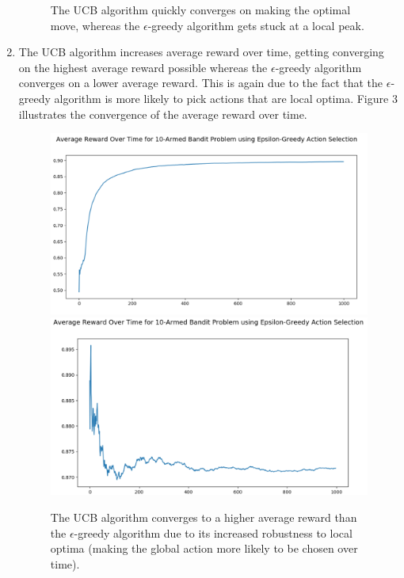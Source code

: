 \documentclass{article}
\begin{document}
\begin{enumerate}
\begin{figure}[h]
	\caption{The UCB algorithm quickly converges on making the optimal move, whereas the $\epsilon$-greedy algorithm gets stuck at a local peak.}
	\end{figure}
	\item The UCB algorithm increases average reward over time, getting converging on the highest average reward possible whereas the $\epsilon$-greedy algorithm converges on a lower average reward. This is again due to the fact that the $\epsilon$-greedy algorithm is more likely to pick actions that are local optima. Figure 3 illustrates the convergence of the average reward over time.
	\begin{figure}[h]
	\centering
	\includegraphics[scale=0.2]{ucb_rew}
	\includegraphics[scale=0.2]{eps_rew}
	\caption{The UCB algorithm converges to a higher average reward than the $\epsilon$-greedy algorithm due to its increased robustness to local optima (making the global action more likely to be chosen over time).}
	\end{figure}
	\end{enumerate}
	
	

	
	
	
	
	
	
	
	
	
	
\end{document}
